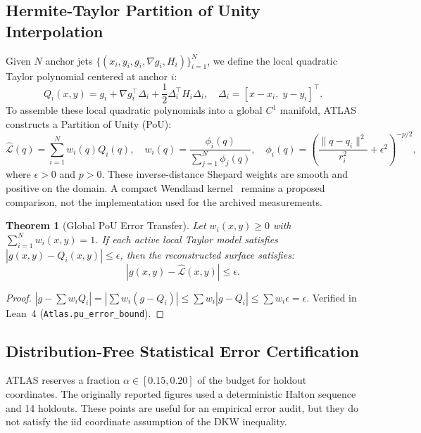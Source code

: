 \documentclass[11pt,a4paper]{article}
\newtheorem{theorem}{Theorem}
\theoremstyle{definition}
\theoremstyle{remark}
\begin{document}
\subsection{Hermite-Taylor Partition of Unity Interpolation}
Given $N$ anchor jets $\{(x_i, y_i, g_i, \nabla g_i, H_i)\}_{i=1}^N$, we define the local quadratic Taylor polynomial centered at anchor $i$:
\begin{equation}
    Q_i(x, y) = g_i + \nabla g_i^\top \Delta_i + \frac{1}{2} \Delta_i^\top H_i \Delta_i, \quad \Delta_i = [x - x_i, \; y - y_i]^\top.
\end{equation}
To assemble these local quadratic polynomials into a global $C^1$ manifold, ATLAS constructs a Partition of Unity (PoU):
\begin{equation}
    \hat{\mathcal{L}}(q) = \sum_{i=1}^N w_i(q) Q_i(q), \quad w_i(q) = \frac{\phi_i(q)}{\sum_{j=1}^N \phi_j(q)}, \quad \phi_i(q) = \left(\frac{\|q-q_i\|^2}{r_i^2}+\epsilon^2\right)^{-p/2},
\end{equation}
where $\epsilon>0$ and $p>0$. These inverse-distance Shepard weights are smooth and positive on the domain. A compact Wendland kernel~\cite{wendland1995piecewise} remains a proposed comparison, not the implementation used for the archived measurements.

\begin{theorem}[Global PoU Error Transfer]\label{thm:pou_error}
Let $w_i(x, y) \ge 0$ with $\sum_{i=1}^N w_i(x, y) = 1$. If each active local Taylor model satisfies $|g(x, y) - Q_i(x, y)| \le \epsilon$, then the reconstructed surface satisfies:
\begin{equation}
    |g(x, y) - \hat{\mathcal{L}}(x, y)| \le \epsilon.
\end{equation}
\end{theorem}
\begin{proof}
$|g - \sum w_i Q_i| = |\sum w_i (g - Q_i)| \le \sum w_i |g - Q_i| \le \sum w_i \epsilon = \epsilon$. Verified in Lean~4 (\texttt{Atlas.pu\_error\_bound}).
\end{proof}

\subsection{Distribution-Free Statistical Error Certification}
ATLAS reserves a fraction $\alpha \in [0.15, 0.20]$ of the budget for holdout coordinates. The originally reported figures used a deterministic Halton sequence and 14 holdouts. These points are useful for an empirical error audit, but they do not satisfy the iid coordinate assumption of the DKW inequality.
\end{document}
